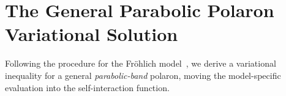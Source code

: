 

\section{The General Parabolic Polaron Variational Solution}

Following the procedure for the Fr\"ohlich model~\cite{feynman_slow_1955,martin_multiple_2023}, we derive a variational inequality for a general \emph{parabolic-band} polaron, moving the model-specific evaluation into the self-interaction function. 

